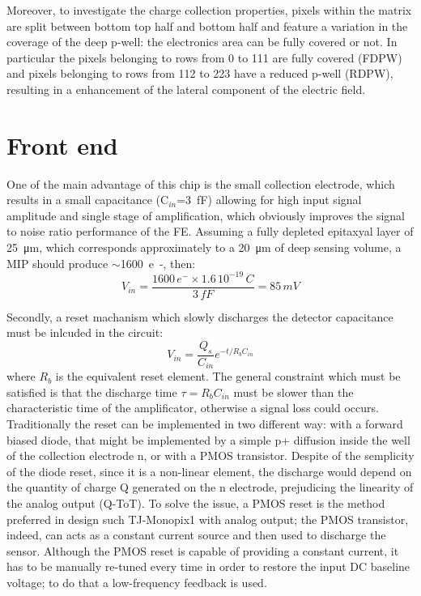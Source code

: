     Moreover, to investigate the charge collection properties, pixels within the matrix are split between bottom top half and bottom half and feature a variation in the coverage of the deep p-well: the electronics area can be fully covered or not. In particular the pixels belonging to rows from 0 to 111 are fully covered (FDPW) and pixels belonging to rows from 112 to 223 have a reduced p-well (RDPW), resulting in a enhancement of the lateral component of the electric field.

    \section{Front end}
        One of the main advantage of this chip is the small collection electrode, which results in a small capacitance (C$_{in}$=\SI{3}{fF}) allowing for high input signal amplitude and single stage of amplification, which obviously improves the signal to noise ratio performance of the FE. Assuming a fully depleted epitaxyal layer of \SI{25}{\um}, which corresponds approximately to a \SI{20}{\um} of deep sensing volume, a MIP should produce $\sim$\SI{1600}{e-}, then:
        \begin{equation}
            V_{in} = \frac{1600\,e^-\times1.6\,10^{-19}\,C }{3\,fF} = 85\,mV
        \end{equation}

        Secondly, a reset machanism which slowly discharges the detector capacitance must be inlcuded in the circuit:
        \begin{equation}
            V_{in } = \frac{Q_s}{C_{in}}e^{-t/R_bC_{in}}
        \end{equation}
        where $R_b$ is the equivalent reset element. The general constraint which must be satisfied is that the discharge time $\tau=R_bC_{in}$ must be slower than the characteristic time of the amplificator, otherwise a signal loss could occurs.
        Traditionally the reset can be implemented in two different way: with a forward biased diode, that might be implemented by a simple p+ diffusion inside the well of the collection electrode n, or with a PMOS transistor. 
        Despite of the semplicity of the diode reset, since it is a non-linear element, the discharge would depend on the quantity of charge Q generated on the n electrode, prejudicing the linearity of the analog output (Q-ToT). To solve the issue, a PMOS reset is the method preferred in design such TJ-Monopix1 with analog output; the PMOS transistor, indeed, can acts as a constant current source and then used to discharge the sensor. 
        Although the PMOS reset is capable of providing a constant current, it has to be manually re-tuned every time in order to restore the input DC baseline voltage; to do that a low-frequency feedback is used. 


